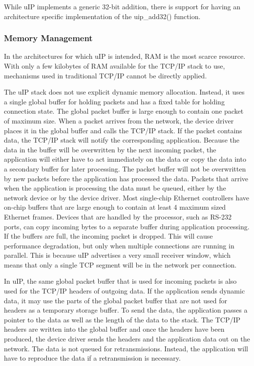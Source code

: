 While u\+IP implements a generic 32-\/bit addition, there is support for having an architecture specific implementation of the uip\+\_\+add32() function.\hypertarget{a00074_memory}{}\subsubsection{Memory Management}\label{a00074_memory}
In the architectures for which u\+IP is intended, R\+AM is the most scarce resource. With only a few kilobytes of R\+AM available for the T\+C\+P/\+IP stack to use, mechanisms used in traditional T\+C\+P/\+IP cannot be directly applied.

The u\+IP stack does not use explicit dynamic memory allocation. Instead, it uses a single global buffer for holding packets and has a fixed table for holding connection state. The global packet buffer is large enough to contain one packet of maximum size. When a packet arrives from the network, the device driver places it in the global buffer and calls the T\+C\+P/\+IP stack. If the packet contains data, the T\+C\+P/\+IP stack will notify the corresponding application. Because the data in the buffer will be overwritten by the next incoming packet, the application will either have to act immediately on the data or copy the data into a secondary buffer for later processing. The packet buffer will not be overwritten by new packets before the application has processed the data. Packets that arrive when the application is processing the data must be queued, either by the network device or by the device driver. Most single-\/chip Ethernet controllers have on-\/chip buffers that are large enough to contain at least 4 maximum sized Ethernet frames. Devices that are handled by the processor, such as R\+S-\/232 ports, can copy incoming bytes to a separate buffer during application processing. If the buffers are full, the incoming packet is dropped. This will cause performance degradation, but only when multiple connections are running in parallel. This is because u\+IP advertises a very small receiver window, which means that only a single T\+CP segment will be in the network per connection.

In u\+IP, the same global packet buffer that is used for incoming packets is also used for the T\+C\+P/\+IP headers of outgoing data. If the application sends dynamic data, it may use the parts of the global packet buffer that are not used for headers as a temporary storage buffer. To send the data, the application passes a pointer to the data as well as the length of the data to the stack. The T\+C\+P/\+IP headers are written into the global buffer and once the headers have been produced, the device driver sends the headers and the application data out on the network. The data is not queued for retransmissions. Instead, the application will have to reproduce the data if a retransmission is necessary.

